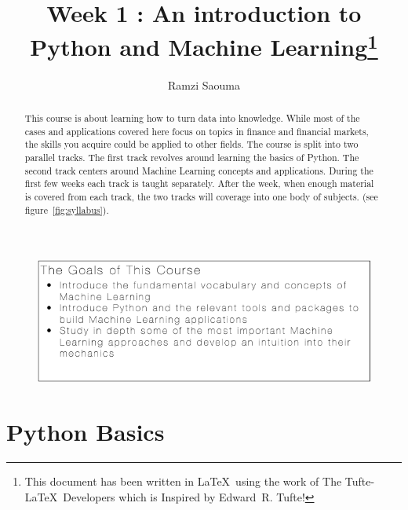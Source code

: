\documentclass{tufte-handout}
\title{Week 1 : An introduction to Python and Machine Learning\thanks{This document has been written in \LaTeX\ using the work of The Tufte-\LaTeX\ Developers which is Inspired by Edward~R. Tufte!}}
\author[Ramzi Saouma]{Ramzi Saouma}
\begin{document}
\maketitle%


\begin{abstract}
\noindent This course is about learning how to turn data into knowledge. While most of the cases and applications covered here focus on topics in finance and financial markets, the skills you acquire could be applied to other fields. The course is split into two parallel tracks. The first track revolves around learning the basics of Python. The second track centers around Machine Learning concepts and applications. During the first few weeks each track is taught separately. After the  week, when enough material is covered from each track, the two tracks will coverage into one body of subjects.  (see figure~\ref{fig:syllabus}).
\end{abstract}
\begin{figure}[h]%
  \includegraphics[width=\linewidth]{Goals.png}
  \caption{}
  \label{fig:packages}
\end{figure}
\section{Python Basics}\label{sec:python-basics}
\end{document}
